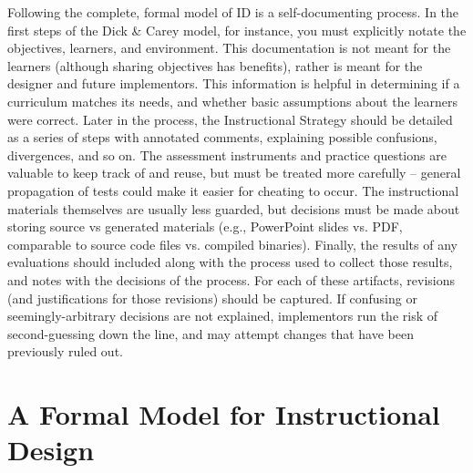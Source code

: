 Following the complete, formal model of ID is a self-documenting process.
In the first steps of the Dick \& Carey model, for instance, you must explicitly notate the objectives, learners, and environment.
This documentation is not meant for the learners (although sharing objectives has benefits), rather is meant for the designer and future implementors.
This information is helpful in determining if a curriculum matches its needs, and whether basic assumptions about the learners were correct.
Later in the process, the Instructional Strategy should be detailed as a series of steps with annotated comments, explaining possible confusions, divergences, and so on.
The assessment instruments and practice questions are valuable to keep track of and reuse, but must be treated more carefully -- general propagation of tests could make it easier for cheating to occur.
The instructional materials themselves are usually less guarded, but decisions must be made about storing source vs generated materials (e.g., PowerPoint slides vs. PDF, comparable to source code files vs. compiled binaries).
Finally, the results of any evaluations should included along with the process used to collect those results, and notes with the decisions of the process.
For each of these artifacts, revisions (and justifications for those revisions) should be captured.
If confusing or seemingly-arbitrary decisions are not explained, implementors run the risk of second-guessing down the line, and may attempt changes that have been previously ruled out.


\section{A Formal Model for Instructional Design}


